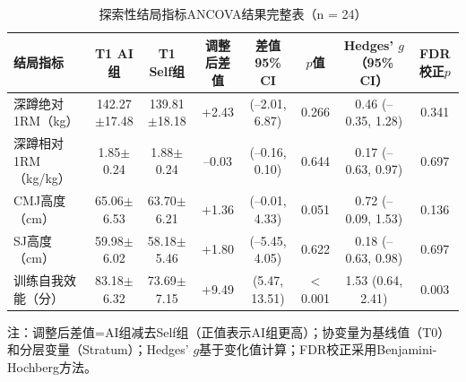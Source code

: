 \begin{landscape}
\thispagestyle{empty}
\begin{table}[htbp]
\centering
\caption{探索性结局指标ANCOVA结果完整表（n = 24）}
\label{tab:app_ancova_full}
\begin{threeparttable}
\scriptsize
\begin{tabular}{lccccccc}
\toprule
结局指标 & T1 AI组 & T1 Self组 & 调整后差值 & 差值95\% CI & $p$值 & Hedges' $g$（95\% CI） & FDR校正$p$ \\
\midrule
深蹲绝对1RM（kg） & 142.27$\pm$17.48 & 139.81$\pm$18.18 & +2.43 & (--2.01, 6.87) & 0.266 & 0.46 (--0.35, 1.28) & 0.341 \\
深蹲相对1RM（kg/kg） & 1.85$\pm$0.24 & 1.88$\pm$0.24 & --0.03 & (--0.16, 0.10) & 0.644 & 0.17 (--0.63, 0.97) & 0.697 \\
CMJ高度（cm） & 65.06$\pm$6.53 & 63.70$\pm$6.21 & +1.36 & (--0.01, 4.33) & 0.051 & 0.72 (--0.09, 1.53) & 0.136 \\
SJ高度（cm） & 59.98$\pm$6.02 & 58.18$\pm$5.46 & +1.80 & (--5.45, 4.05) & 0.622 & 0.18 (--0.63, 0.98) & 0.697 \\
训练自我效能（分） & 83.18$\pm$6.32 & 73.69$\pm$7.15 & +9.49 & (5.47, 13.51) & $<$0.001 & 1.53 (0.64, 2.41) & 0.003 \\
\bottomrule
\end{tabular}
\begin{tablenotes}[flushleft]\footnotesize
\item 注：调整后差值=AI组减去Self组（正值表示AI组更高）；协变量为基线值（T0）和分层变量（Stratum）；Hedges' $g$基于变化值计算；FDR校正采用Benjamini-Hochberg方法。
\end{tablenotes}
\end{threeparttable}
\end{table}
\end{landscape}

